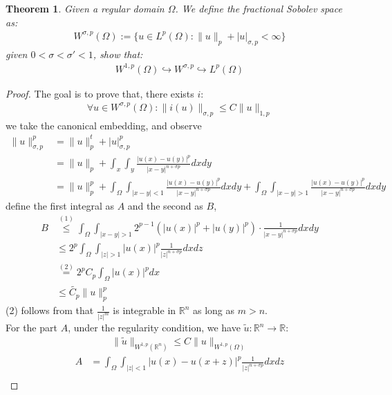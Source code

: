 \documentclass[a4paper,11pt,oneside,fleqn]{book}
\newtheorem{theorem}{Theorem}[section]
\theoremstyle{definition}
\theoremstyle{remark}
\begin{document}
\begin{theorem}
Given a regular domain $\Omega$. We define the fractional Sobolev space as:
\begin{align*}
	W^{\sigma, p}(\Omega):= \{ u \in L^p(\Omega) : \|u\|_p + |u|_{\sigma, p} < \infty \}
\end{align*}
given $0 < \sigma < \sigma' < 1$,  show that:
\begin{align*}
	W^{1, p}(\Omega) \hookrightarrow W^{\sigma, p} \hookrightarrow L^p(\Omega)
\end{align*}
\end{theorem}
\begin{proof}
	The goal is to prove that, there exists $i$:
	\begin{align*}
		\forall u \in W^{\sigma, p}(\Omega): \|i(u)\|_{\sigma, p} \leq C
		\|u\|_{1, p}
  	\end{align*}
  	we take the canonical embedding, and observe
  	\begin{align*}
  		\|u\|_{\sigma, p}^p &= \|u\|_p^t + |u|_{\sigma, p}^p\\
  		&= \|u\|_p + \int_x \int_y  \frac{|u(x) - u(y)|^p}{|x - y|^{n + \sigma p}} dx dy\\
  		&= \|u\|_p^p + \int_{\Omega}\int_{|x-y| < 1} \frac{|u(x) - u(y)|^p}{|x - y|^{n +\sigma p}} dx dy + \int_{\Omega} \int_{|x-y| > 1}\frac{|u(x) - u(y)|^p}{|x - y|^{n +\sigma p}} dx dy
  	\end{align*}
  	define the first integral as $A$ and the second as $B$, 
  	\begin{align*}
  	 B & \overset{(1)}{\leq} \int_\Omega \int_{|x -y| > 1} 2^{p-1} (|u(x)|^p + |u(y)|^p) \cdot \frac{1}{|x - y|^{n + \sigma p}} dxdy\\
  	   &\leq 2^p \int_\Omega \int_{|z| > 1} |u(x)|^p \frac{1}{|z|^{n + \sigma p}}dx dz\\
  	   &\overset{(2)}{=} 2^p C_p \int_{\Omega} |u(x)|^p dx  \\
  		   &\leq \tilde{C_p} \|u\|_p^p
  	\end{align*}
  	(2) follows from that $\frac{1}{|z|^m}$ is integrable in $\mathbb{R}^n$ as long as $m > n$.\\
  	For the part $A$, under the regularity condition, we have $\tilde{u}: \mathbb{R}^n \rightarrow \mathbb{R}$:
  	\begin{align*}
  		\|\tilde{u}\|_{W^{1, p}(\mathbb{R}^n)} \leq C\|u\|_{W^{1, p}(\Omega)}
  	\end{align*}
  	\begin{align*}
  		A &= \int_\Omega \int_{|z| < 1} |u(x) - u(x + z)|^p \frac{1}{|z|^{n + \sigma p}} dx dz\\

\end{align*}
\end{proof}
\end{document}
